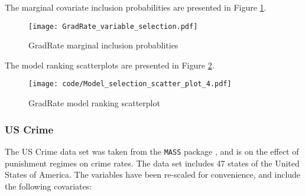 \documentclass{amsart}[12pt]
\begin{document}
The marginal covariate inclusion probabilities are presented in Figure \ref{fig:GradRate_inclusion}.


\begin{figure}[p]
	\texttt{[image: GradRate\_variable\_selection.pdf]}
	\caption{GradRate marginal inclusion probablities}
	\label{fig:GradRate_inclusion}
\end{figure}

The model ranking scatterplots are presented in Figure \ref{fig:GradRate_model_ranking}.

\begin{figure}[p]
	\texttt{[image: code/Model\_selection\_scatter\_plot\_4.pdf]}
	\caption{GradRate model ranking scatterplot}
	\label{fig:GradRate_model_ranking}
\end{figure}

\subsubsection{US Crime}
The US Crime data set was taken from the \texttt{MASS} package \cite{Venables2002}, and is on the effect of
punishment regimes on crime rates. The data set includes 47 states of the United States of America. The
variables have been re-scaled for convenience, and include the following covariates:
\end{document}

